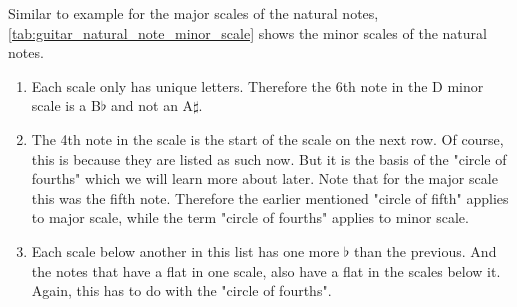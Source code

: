 Similar to example for the major scales of the natural notes, \autoref{tab:guitar_natural_note_minor_scale} shows the minor scales of the natural notes.

\begin{enumerate}
	\item Each scale only has unique letters. Therefore the 6th note in the D minor scale is a B$\flat$ and not an A$\sharp$.
	\item The 4th note in the scale is the start of the scale on the next row. Of course, this is because they are listed as such now. But it is the basis of the "circle of fourths" which we will learn more about later. Note that for the major scale this was the fifth note. Therefore the earlier mentioned "circle of fifth" applies to major scale, while the term "circle of fourths" applies to minor scale.
	\item Each scale below another in this list has one more $\flat$ than the previous. And the notes that have a flat in one scale, also have a flat in the scales below it. Again, this has to do with the "circle of fourths".
\end{enumerate}

